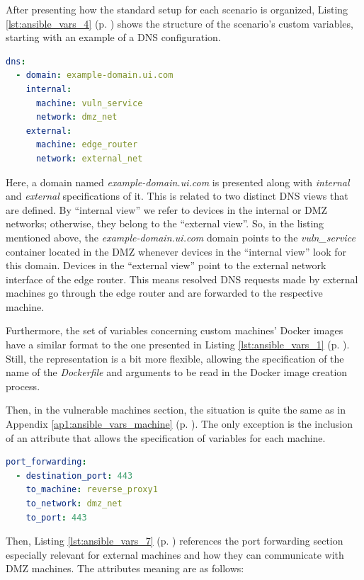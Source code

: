 After presenting how the standard setup for each scenario is organized, Listing \ref{lst:ansible_vars_4} (p. \pageref{lst:ansible_vars_4}) shows the structure of the scenario's custom variables, starting with an example of a DNS configuration.

\begin{lstlisting}[language=yaml,caption=Ansible Variables - DNS.,numbers=none,label={lst:ansible_vars_4}]
dns:
  - domain: example-domain.ui.com
    internal:
      machine: vuln_service
      network: dmz_net
    external:
      machine: edge_router
      network: external_net
\end{lstlisting}

Here, a domain named \textit{example-domain.ui.com} is presented along with \textit{internal} and \textit{external} specifications of it. This is related to two distinct DNS views that are defined. By ``internal view'' we refer to devices in the internal or DMZ networks; otherwise, they belong to the ``external view''. So, in the listing mentioned above, the \textit{example-domain.ui.com} domain points to the \textit{vuln\_service} container located in the DMZ whenever devices in the ``internal view'' look for this domain. Devices in the ``external view'' point to the external network interface of the edge router. This means resolved DNS requests made by external machines go through the edge router and are forwarded to the respective machine. 

Furthermore, the set of variables concerning custom machines' Docker images have a similar format to the one presented in Listing \ref{lst:ansible_vars_1} (p. \pageref{lst:ansible_vars_1}). Still, the representation is a bit more flexible, allowing the specification of the name of the \textit{Dockerfile} and arguments to be read in the Docker image creation process.

Then, in the vulnerable machines section, the situation is quite the same as in Appendix \ref{ap1:ansible_vars_machine} (p. \pageref{ap1:ansible_vars_machine}). The only exception is the inclusion of an attribute that allows the specification of variables for each machine.

\begin{lstlisting}[language=yaml,caption=Ansible Variables - Port Forwarding.,numbers=none,label={lst:ansible_vars_7}]
port_forwarding:
  - destination_port: 443
    to_machine: reverse_proxy1
    to_network: dmz_net
    to_port: 443
\end{lstlisting}

Then, Listing \ref{lst:ansible_vars_7} (p. \pageref{lst:ansible_vars_7}) references the port forwarding section especially relevant for external machines and how they can communicate with DMZ machines. The attributes meaning are as follows: 

